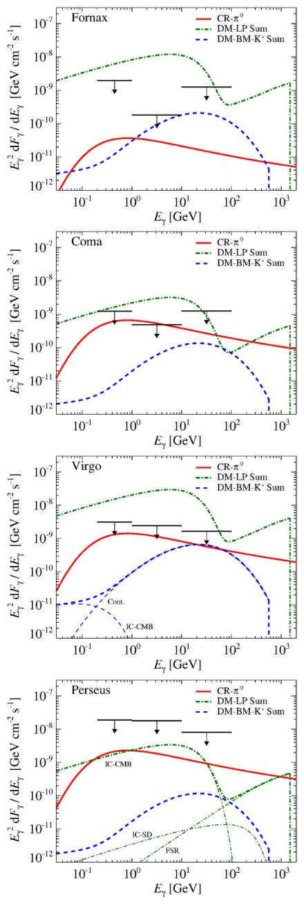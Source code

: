 \documentclass[10pt,aps,pra,reprint,amsmath,amsfonts,amssymb,showpacs,nofootinbib,floatfix]{revtex4-1}
\def\del#1{{}}
\newcommand{\rmn}{\mathrm}
\newcommand{\sub}{\rmn{sub}}
\newcommand{\msun}{M_\odot}
\newcommand{\dd}{\rmn{d}}
\begin{document}
\del{
\begin{eqnarray}
L_{\gamma,\rmn{sub tot}} \propto N\,L_{\gamma,\sub} \propto N\,M_\sub 
 \propto M_\sub^{\left(A+1\right)}\,\frac{\dd N_\sub}{\dd M} \propto  M^{A-0.9}
\end{eqnarray}
Assuming that the concentration $c$ decrease for increasing mass as it
does for the mass range $10^{12}-10^{14}\,\msun$ where
$L_{\gamma,\sub} \propto N\,M_\sub^A$, where $A<1$.
}

\begin{figure}
\begin{minipage}{2.0\columnwidth}
 \includegraphics[width=0.49\columnwidth]{figures/flux.cluster.Fornax.v11.0.1deg.1.6T.SubMass.SF300.IR2.noMW.woGal.eps}
\includegraphics[width=0.49\columnwidth]{figures/flux.cluster.Coma.v11.0.1deg.1.6T.SubMass.SF300.IR2.noMW.woGal.eps}
\includegraphics[width=0.49\columnwidth]{figures/flux.cluster.Virgo.v11.0.1deg.1.6T.SubMass.SF300.IR2.noMW.woGal.eps}
\includegraphics[width=0.49\columnwidth]{figures/flux.cluster.Perseus.v11.0.1deg.1.6T.SubMass.SF300.IR2.noMW.woGal.eps}

\end{minipage}
\end{figure}
\end{document}
